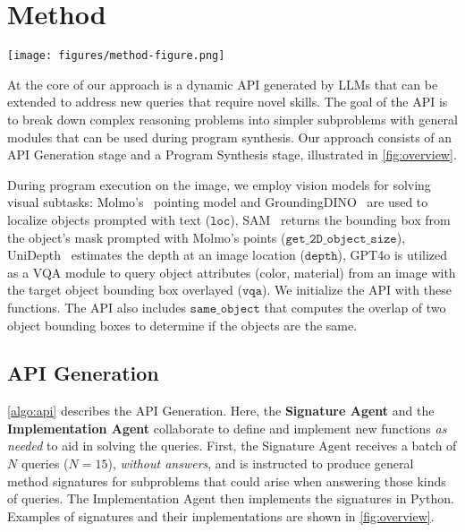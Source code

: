 \section{Method}
\label{sec:method}

\begin{figure*}[t!]
  \centering
  \texttt{[image: figures/method-figure.png]}
  \vspace{-7mm}
  \caption{\textbf{Overview.} \method consists of an API generation stage and a program synthesis stage. The Signature \& Implementation Agents generate an API that is used by the Program Agent to produce a program to answer the question, executed by the Execution Agent.}
  \label{fig:overview}
  \vspace{-3mm}
\end{figure*}

At the core of our approach is a dynamic API generated by LLMs that can be extended to address new queries that require novel skills. The goal of the API is to break down complex reasoning problems into simpler subproblems with general modules that can be used during program synthesis. Our approach consists of an API Generation stage and a Program Synthesis stage, illustrated in \cref{fig:overview}.

During program execution on the image, we employ vision models for solving visual subtasks:
Molmo's~\cite{molmo} pointing model and GroundingDINO~\cite{groundingdino} are used to localize objects prompted with text ($\texttt{loc}$), SAM~\cite{sam} returns the bounding box from the object's mask prompted with Molmo's points ($\texttt{get\_2D\_object\_size}$), UniDepth~\cite{unidepth} estimates the depth at an image location ($\texttt{depth}$), GPT4o is utilized as a VQA module to query object attributes (color, material) from an image with the target object bounding box overlayed ($\texttt{vqa}$). We initialize the API with these functions. The API also includes $\texttt{same\_object}$ that computes the overlap of two object bounding boxes to determine if the objects are the same.

\subsection{API Generation}

\cref{algo:api} describes the API Generation. Here, the \textbf{Signature Agent} and the \textbf{Implementation Agent} collaborate to define and implement new functions \emph{as needed} to aid in solving the queries. 
First, the Signature Agent receives a batch of $N$ queries ($N=15$), \emph{without answers}, and is instructed to produce general method signatures for subproblems that could arise when answering those kinds of queries. The Implementation Agent then implements the signatures in Python.
Examples of signatures and their implementations are shown in \cref{fig:overview}.


